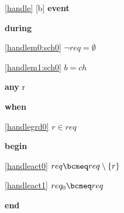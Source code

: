 \noindent \ref{handle} [b] \textbf{event}
\begin{block}
  \item   \textbf{during}
  \begin{block}
  \item[ \eqref{handlem0:sch0} ]{$\neg req = \emptyset$} %
  \item[ \eqref{handlem1:sch0} ]{$b = ch$} %
  \end{block}
  \item   \textbf{any} r
  \item   \textbf{when}
  \begin{block}
  \item[ \eqref{handlegrd0} ]{$r \in req$} %
  \end{block}
  \item   \textbf{begin}
  \begin{block}
  \item[ \eqref{handleact0} ]{$req \bcmeq req \setminus \{ r \}$} %
  \item[ \eqref{handleact1} ]{$req_0 \bcmeq req$} %
  \end{block}
  \item   \textbf{end} \\
\end{block}
